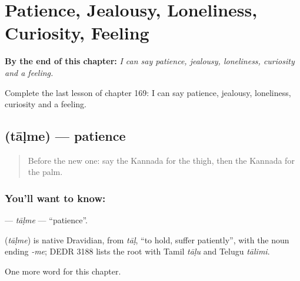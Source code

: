 
\chapter{Patience, Jealousy, Loneliness, Curiosity, Feeling}
\label{ch:ka-patience-jealousy-loneliness-curiosity-feeling}

\begin{chapteropening}
\textbf{By the end of this chapter:} \emph{I can say patience, jealousy, loneliness, curiosity and a feeling.}

Complete the last lesson of chapter 169: I can say patience, jealousy, loneliness, curiosity and a feeling.
\end{chapteropening}

\section[\texorpdfstring{\kn{ತಾಳ್ಮೆ} (tāḷme)}{ತಾಳ್ಮೆ (tāḷme)}]{ (tāḷme) — patience}

\label{lesson:KA-C169-talme}



\begin{quote}
Before the new one: say the Kannada for the thigh, then the Kannada for the palm.
\end{quote}

\subsection*{You'll want to know: }
\textbf{} — \emph{tāḷme} — \textquotedblleft{}patience\textquotedblright{}.

\begin{cousinweb}
\textbf{} (\emph{tāḷme}) is native Dravidian, from \emph{tāḷ}, \textquotedblleft{}to hold, suffer patiently\textquotedblright{}, with the noun ending \emph{-me}; DEDR 3188 lists the root with Tamil \emph{tāḷu} and Telugu \emph{tālimi}.
\end{cousinweb}

\begin{grammarlens}[title={What you've built}]
One more word for this chapter.
\end{grammarlens}

